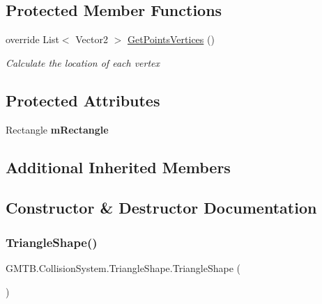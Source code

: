 \subsection*{Protected Member Functions}
\begin{DoxyCompactItemize}
\item 
override List$<$ Vector2 $>$ \mbox{\hyperlink{class_g_m_t_b_1_1_collision_system_1_1_triangle_shape_afe82a9ab85c8bf9404319a3465cbb286}{Get\+Points\+Vertices}} ()
\begin{DoxyCompactList}\small\item\em Calculate the location of each vertex \end{DoxyCompactList}\end{DoxyCompactItemize}
\subsection*{Protected Attributes}
\begin{DoxyCompactItemize}
\item 
\mbox{\label{class_g_m_t_b_1_1_collision_system_1_1_triangle_shape_a0a8745bba205d49fdf98c16cb8d215aa}} 
Rectangle {\bfseries m\+Rectangle}
\end{DoxyCompactItemize}
\subsection*{Additional Inherited Members}


\subsection{Constructor \& Destructor Documentation}
\mbox{\label{class_g_m_t_b_1_1_collision_system_1_1_triangle_shape_aaba9290967fc804a9d1f7b8c5a05bbba}} 
\subsubsection{\texorpdfstring{TriangleShape()}{TriangleShape()}}
{\footnotesize\ttfamily G\+M\+T\+B.\+Collision\+System.\+Triangle\+Shape.\+Triangle\+Shape (\begin{DoxyParamCaption}{ }\end{DoxyParamCaption})}



